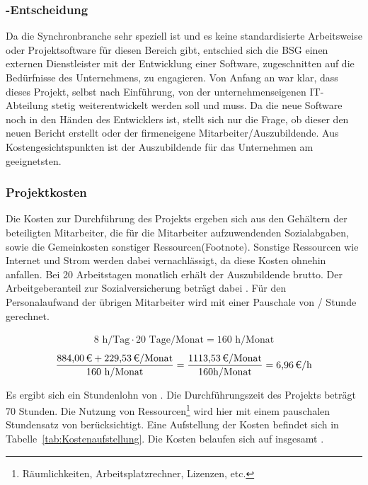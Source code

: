 \subsubsection{-Entscheidung}
\label{sec:MakeOrBuyEntscheidung}
Da die Synchronbranche sehr speziell ist und es keine standardisierte Arbeitsweise oder Projektsoftware für diesen Bereich gibt, entschied sich die BSG einen externen Dienstleister mit der Entwicklung einer Software, zugeschnitten auf die Bedürfnisse des Unternehmens, zu engagieren. Von Anfang an war klar, dass dieses Projekt, selbst nach Einführung, von der unternehmenseigenen IT-Abteilung stetig weiterentwickelt werden soll und muss. Da die neue Software noch in den Händen des Entwicklers ist, stellt sich nur die Frage, ob dieser den neuen Bericht erstellt oder der firmeneigene Mitarbeiter/Auszubildende. Aus Kostengesichtspunkten ist der Auszubildende für das Unternehmen am geeignetsten. 

\subsubsection{Projektkosten}
\label{sec:Projektkosten}
Die Kosten zur Durchführung des Projekts ergeben sich aus den Gehältern der beteiligten Mitarbeiter, die für die Mitarbeiter aufzuwendenden Sozialabgaben, sowie die Gemeinkosten sonstiger Ressourcen(Footnote). Sonstige Ressourcen wie Internet und Strom werden dabei vernachlässigt, da diese Kosten ohnehin anfallen. Bei 20 Arbeitstagen monatlich erhält der Auszubildende  brutto. Der Arbeitgeberanteil zur Sozialversicherung beträgt dabei . Für den Personalaufwand der übrigen Mitarbeiter wird mit einer Pauschale von  / Stunde gerechnet.

\begin{eqnarray}
8 \mbox{ h/Tag}  \cdot 20 \mbox{ Tage/Monat}  = 160  \mbox{ h/Monat}
\end{eqnarray}
\begin{eqnarray}
\frac{\eur{884,00} + \eur{229,53}\mbox{/Monat}}{160\mbox{ h/Monat}} = \frac{\eur{1113,53}\mbox{/Monat}}{160\mbox{h/Monat}} = \eur{6,96}\mbox{/h}
\end{eqnarray}

Es ergibt sich ein Stundenlohn von . Die Durchführungszeit des Projekts beträgt 70 Stunden. Die Nutzung von Ressourcen\footnote{Räumlichkeiten, Arbeitsplatzrechner, Lizenzen, etc.} wird hier mit einem pauschalen Stundensatz von  berücksichtigt. Eine Aufstellung der Kosten befindet sich in Tabelle~\ref{tab:Kostenaufstellung}. Die Kosten belaufen sich auf insgesamt .

